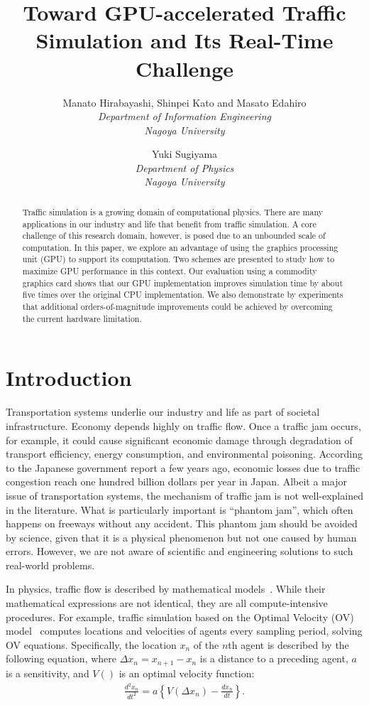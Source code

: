 \documentclass[times, 10pt, twocolumn]{article}
\title{Toward GPU-accelerated Traffic Simulation and Its Real-Time Challenge}
\author {
Manato Hirabayashi, Shinpei Kato and Masato Edahiro\\
\textit{Department of Information Engineering}\\
\textit{Nagoya University}\\
\and
Yuki Sugiyama\\
\textit{Department of Physics}\\
\textit{Nagoya University}\\
}
\begin{document}
\maketitle


\begin{abstract}
 Traffic simulation is a growing domain of computational physics.
 There are many applications in our industry and life that benefit from
 traffic simulation.
 A core challenge of this research domain, however, is posed due to
 an unbounded scale of computation.
 In this paper, we explore an advantage of using the graphics processing
 unit (GPU) to support its computation.
 Two schemes are presented to study how to maximize GPU
 performance in this context.
 Our evaluation using a commodity graphics card shows that our GPU
 implementation improves simulation time by about five times over the
 original CPU implementation.
 We also demonstrate by experiments that additional orders-of-magnitude
 improvements could be achieved by overcoming the current hardware
 limitation.
\end{abstract}

\section{Introduction}

Transportation systems underlie our industry and life as part of
societal infrastructure.
Economy depends highly on traffic flow.
Once a traffic jam occurs, for example, it could cause significant
economic damage through degradation of transport efficiency, energy
consumption, and environmental poisoning.
According to the Japanese government report a few years ago, economic
losses due to traffic congestion reach one hundred billion dollars per
year in Japan.
Albeit a major issue of transportation systems, the mechanism of traffic
jam is not well-explained in the literature.
What is particularly important is ``phantom jam'', which often happens
on freeways without any accident.
This phantom jam should be avoided by science, given that it is
a physical phenomenon but not one caused by human errors.
However, we are not aware of scientific and engineering solutions to
such real-world problems.

In physics, traffic flow is described by mathematical
models~\cite{Bando1995, Kerner1993, Nagel1992}.
While their mathematical expressions are not identical, they are all
compute-intensive procedures.
For example, traffic simulation based on the Optimal Velocity (OV)
model~\cite{Bando1995} computes locations and velocities of agents every
sampling period, solving OV equations. 
Specifically, the location $x_n$ of the $n$th agent is described by the
following equation, where $\Delta x_n = x_{n+1} - x_n$ is a distance to
a preceding agent, $a$ is a sensitivity, and $V()$ is an optimal
velocity function:
\begin{eqnarray}
 \label{eqn:ov}
 \frac{d^2 x_n}{d t^2} = a \left\{V(\Delta x_n) - \frac{d x_n}{d t}\right\}.
\end{eqnarray}
\end{document}
